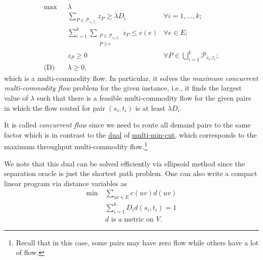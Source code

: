 \begin{equation}\label{eq:non-uniform-sparsest-cut-LP-dual}
	\begin{aligned}
		\max~           & \lambda                                                                                                                 \\
		                & \sum_{P \in \mathcal{P} _{s_i, t_i}} z_P \geq \lambda D_i    & \forall i = 1, \dots , k;                                \\
		                & \sum_{i=1}^{k} \sum_{\substack{P \in \mathcal{P} _{s_i, t_i}                                                            \\ P \ni e}} z_P \leq c(e) & \forall e \in E;                                         \\
		                & z_P \geq 0                                                   & \forall P \in \bigcup_{i=1}^{k} \mathcal{P} _{s_i, t_i}; \\
		\text{(D)}\quad & \lambda \geq 0,
	\end{aligned}
\end{equation}
which is a multi-commodity flow. In particular, it solves the \emph{maximum concurrent multi-commodity flow} problem for the given instance, i.e., it finds the largest value of \(\lambda \) such that there is a feasible multi-commodity flow for the given pairs in which the flow routed for pair \((s_i, t_i)\) is at least \(\lambda D_i\).

\begin{notation}
	It is called \emph{concurrent flow} since we need to route all demand pairs to the same factor which is in contrast to the \hyperref[eq:multi-min-cut-LP]{dual} of \hyperref[prb:multi-min-cut]{multi-min-cut}, which corresponds to the maximum throughput multi-commodity flow.\footnote{Recall that in this case, some pairs may have zero flow while others have a lot of flow.}
\end{notation}

We note that this dual can be solved efficiently via ellipsoid method since the separation oracle is just the shortest path problem. One can also write a compact linear program via distance variables as
\[
	\begin{aligned}
		\min~ & \sum_{uv \in E} c(uv) d(uv)        \\
		      & \sum_{i=1}^{k} D_i d(s_i, t_i) = 1 \\
		      & \text{\(d\) is a metric on \(V\)}.
	\end{aligned}
\]

